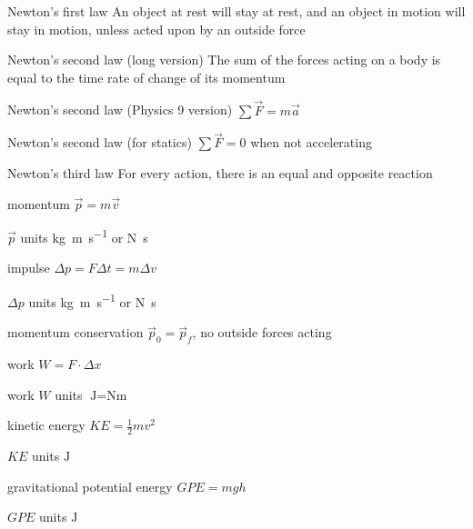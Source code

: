 \documentclass[avery5371,grid]{flashcards}
\begin{document}
\begin{flashcard}{Newton's first law}
An object at rest will stay at rest, and an object in motion will stay in motion, unless acted upon by an outside force
\end{flashcard}
\begin{flashcard}{Newton's second law (long version)}
The sum of the forces acting on a body is equal to the time rate of change of its momentum
\end{flashcard}
\begin{flashcard}{Newton's second law (Physics 9 version)}
$\sum \vec{F} = m \vec{a}$
\end{flashcard}
\begin{flashcard}{Newton's second law (for statics)}
$\sum \vec{F} = 0$ when not accelerating
\end{flashcard}
\begin{flashcard}{Newton's third law}
For every action, there is an equal and opposite reaction
\end{flashcard}

\begin{flashcard}{momentum}
$\vec{p} = m \vec{v}$
\end{flashcard}
\begin{flashcard}{$\vec{p}$ units}
\si{\kilo\gram\meter\per\second} or \si{\newton\second}
\end{flashcard}
\begin{flashcard}{impulse}
$\Delta p = F \Delta t = m \Delta v$
\end{flashcard}
\begin{flashcard}{$\Delta p$ units}
\si{\kilo\gram\meter\per\second} or \si{\newton\second}
\end{flashcard}
\begin{flashcard}{momentum conservation}
$\vec{p}_0 = \vec{p}_f$, no outside forces acting
\end{flashcard}

\begin{flashcard}{work}
$W = F\cdot \Delta x$
\end{flashcard}
\begin{flashcard}{work $W$ units}
$\si{\joule} = \si{\newton\meter}$
\end{flashcard}
\begin{flashcard}{kinetic energy}
$KE = \frac{1}{2} m v^2$
\end{flashcard}
\begin{flashcard}{$KE$ units}
$\si{\joule}$
\end{flashcard}
\begin{flashcard}{gravitational potential energy}
$GPE = mgh$
\end{flashcard}
\begin{flashcard}{$GPE$ units}
$\si{\joule}$
\end{flashcard}
\end{document}
